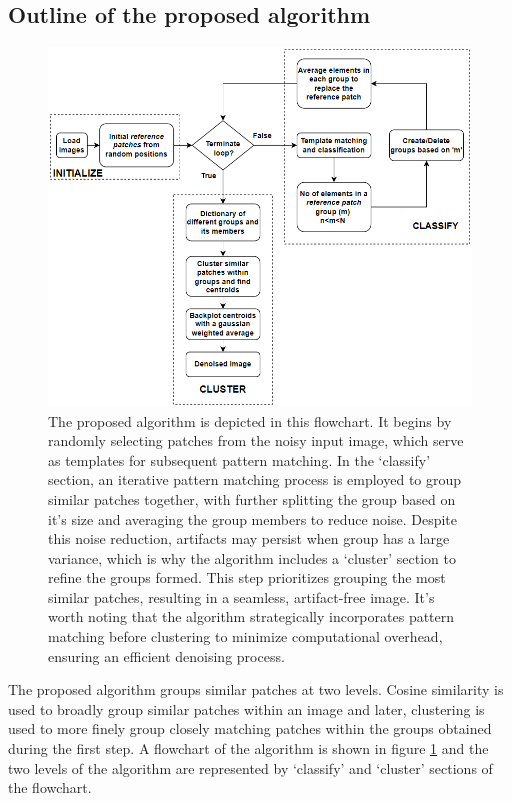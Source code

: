 \documentclass[fleqn,10pt]{wlscirep}
\begin{document}
	\subsection*{Outline of the proposed algorithm}
	
	\begin{figure}[H]
		\centering
		\includegraphics[scale=0.7]{./imgs/flowchart.png}
		\caption{ The proposed algorithm is depicted in this flowchart. It begins by randomly selecting patches from the noisy input image, which serve as templates for subsequent pattern matching. In the `classify' section, an iterative pattern matching process is employed to group similar patches together, with further splitting the group based on it's size and averaging the group members to reduce noise. Despite this noise reduction, artifacts may persist when group has a large variance, which is why the algorithm includes a `cluster' section to refine the groups formed. This step prioritizes grouping the most similar patches, resulting in a seamless, artifact-free image. It's worth noting that the algorithm strategically incorporates pattern matching before clustering to minimize computational overhead, ensuring an efficient denoising process.}
		\label{fig:flowchart}
	\end{figure} 
	
	The proposed algorithm groups similar patches at two levels. Cosine similarity is used to broadly group similar patches within an image and later, clustering is used to more finely group closely matching patches within the groups obtained during the first step. A flowchart of the algorithm is shown in figure \ref{fig:flowchart} and the two levels of the algorithm are represented by `classify' and `cluster' sections of the flowchart.
	
\end{document}
